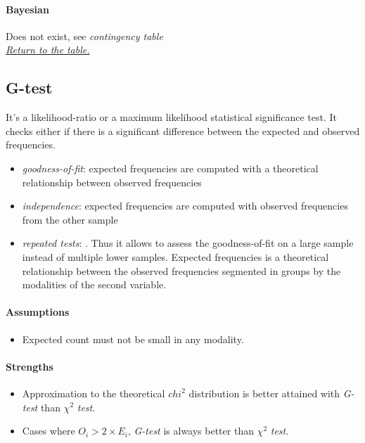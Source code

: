 \paragraph{Bayesian}
Does not exist, see \emph{contingency table} \\

\textit{\hyperref[statistical_method_table]{Return to the table.}}


\subsection{G-test}

It's a likelihood-ratio or a maximum likelihood statistical significance test. 
It checks either if there is a significant difference between the expected and observed 
frequencies. 
\begin{itemize}
    \item \emph{goodness-of-fit}: expected frequencies are computed with a theoretical 
        relationship between observed frequencies
    \item \emph{independence}: expected frequencies are computed with observed frequencies
        from the other sample
    \item \emph{repeated tests}: . Thus it
        allows to assess the goodness-of-fit on a large sample instead of multiple lower
        samples. Expected frequencies is a theoretical relationship between the observed
        frequencies segmented in groups by the modalities of the second variable.
\end{itemize}


\paragraph{Assumptions}
\begin{itemize}
    \item Expected count must not be small in any modality.
\end{itemize}

\paragraph{Strengths}
\begin{itemize}
    \item Approximation to the theoretical $chi^{2}$ distribution is better attained with
        \emph{G-test} than $\chi^{2}$ \emph{test}.
    \item Cases where $O_{i} > 2\times E_{i}$, \emph{G-test} is always better than
        $\chi^{2}$ \emph{test}.
\end{itemize}

